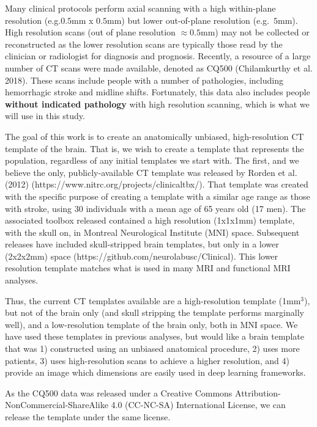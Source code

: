 \documentclass[]{elsarticle} %
\begin{document}
Many clinical protocols perform axial scanning with a high within-plane resolution (e.g.\(0.5\)mm x \(0.5\)mm) but lower out-of-plane resolution (e.g.~\(5\)mm). High resolution scans (out of plane resolution \(\approx 0.5\)mm) may not be collected or reconstructed as the lower resolution scans are typically those read by the clinician or radiologist for diagnosis and prognosis. Recently, a resource of a large number of CT scans were made available, denoted as CQ500 (Chilamkurthy et al. 2018). These scans include people with a number of pathologies, including hemorrhagic stroke and midline shifts. Fortunately, this data also includes people \textbf{without indicated pathology} with high resolution scanning, which is what we will use in this study.

The goal of this work is to create an anatomically unbiased, high-resolution CT template of the brain. That is, we wish to create a template that represents the population, regardless of any initial templates we start with. The first, and we believe the only, publicly-available CT template was released by Rorden et al. (2012) (https://www.nitrc.org/projects/clinicaltbx/). That template was created with the specific purpose of creating a template with a similar age range as those with stroke, using 30 individuals with a mean age of 65 years old (17 men). The associated toolbox released contained a high resolution (1x1x1mm) template, with the skull on, in Montreal Neurological Institute (MNI) space. Subsequent releases have included skull-stripped brain templates, but only in a lower (2x2x2mm) space (https://github.com/neurolabusc/Clinical). This lower resolution template matches what is used in many MRI and functional MRI analyses.

Thus, the current CT templates available are a high-resolution template (1mm\(^3\)), but not of the brain only (and skull stripping the template performs marginally well), and a low-resolution template of the brain only, both in MNI space. We have used these templates in previous analyses, but would like a brain template that was 1) constructed using an unbiased anatomical procedure, 2) uses more patients, 3) uses high-resolution scans to achieve a higher resolution, and 4) provide an image which dimensions are easily used in deep learning frameworks.

As the CQ500 data was released under a Creative Commons Attribution-NonCommercial-ShareAlike 4.0 (CC-NC-SA) International License, we can release the template under the same license.
\end{document}
